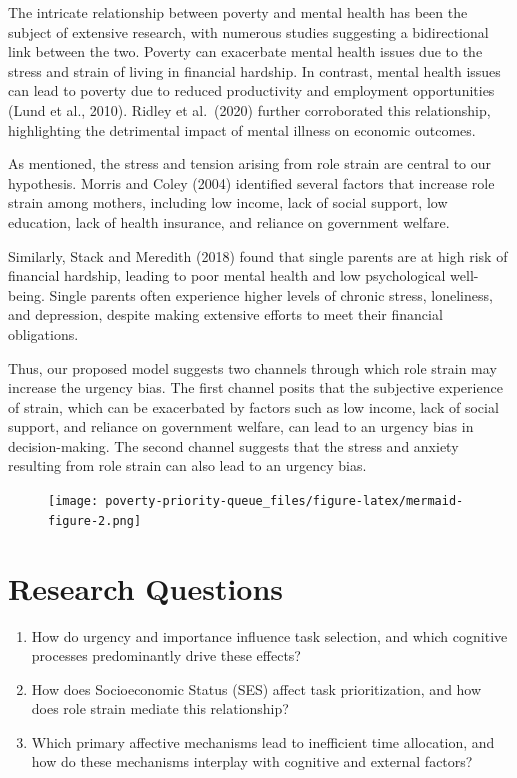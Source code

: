 \documentclass[
]{report}
\begin{document}
The intricate relationship between poverty and mental health has been
the subject of extensive research, with numerous studies suggesting a
bidirectional link between the two. Poverty can exacerbate mental health
issues due to the stress and strain of living in financial hardship. In
contrast, mental health issues can lead to poverty due to reduced
productivity and employment opportunities (Lund et al., 2010). Ridley et
al.~(2020) further corroborated this relationship, highlighting the
detrimental impact of mental illness on economic outcomes.

As mentioned, the stress and tension arising from role strain are
central to our hypothesis. Morris and Coley (2004) identified several
factors that increase role strain among mothers, including low income,
lack of social support, low education, lack of health insurance, and
reliance on government welfare.

Similarly, Stack and Meredith (2018) found that single parents are at
high risk of financial hardship, leading to poor mental health and low
psychological well-being. Single parents often experience higher levels
of chronic stress, loneliness, and depression, despite making extensive
efforts to meet their financial obligations.

Thus, our proposed model suggests two channels through which role strain
may increase the urgency bias. The first channel posits that the
subjective experience of strain, which can be exacerbated by factors
such as low income, lack of social support, and reliance on government
welfare, can lead to an urgency bias in decision-making. The second
channel suggests that the stress and anxiety resulting from role strain
can also lead to an urgency bias.

\begin{figure}[H]

{\centering \texttt{[image: poverty-priority-queue\_files/figure-latex/mermaid-figure-2.png]}

}

\end{figure}

\hypertarget{research-questions}{%
\section{Research Questions}\label{research-questions}}

\begin{enumerate}
\def\labelenumi{\arabic{enumi}.}
\item
  How do urgency and importance influence task selection, and which
  cognitive processes predominantly drive these effects?
\item
  How does Socioeconomic Status (SES) affect task prioritization, and
  how does role strain mediate this relationship?
\item
  Which primary affective mechanisms lead to inefficient time
  allocation, and how do these mechanisms interplay with cognitive and
  external factors?
\end{enumerate}
\end{document}
